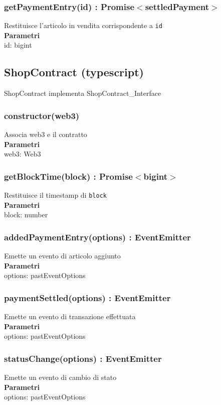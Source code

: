\documentclass[a4paper, 12pt]{article}
\begin{document}
\subsubsection{getPaymentEntry(id) : Promise$<$settledPayment$>$}
Restituisce l'articolo in vendita corrispondente a \texttt{id}\\
\textbf{Parametri}\\
id: bigint

\subsection{ShopContract (typescript)}
ShopContract implementa ShopContract\_Interface
\subsubsection{constructor(web3)}
Associa web3 e il contratto\\
\textbf{Parametri}\\
web3: Web3\\
\subsubsection{getBlockTime(block) : Promise$<$bigint$>$}
Restituisce il timestamp di \texttt{block}\\
\textbf{Parametri}\\
block: number\\
\subsubsection{addedPaymentEntry(options) : EventEmitter}
Emette un evento di articolo aggiunto\\
\textbf{Parametri}\\
options: pastEventOptions
\subsubsection{paymentSettled(options) : EventEmitter}
Emette un evento di transazione effettuata\\
\textbf{Parametri}\\
options: pastEventOptions
\subsubsection{statusChange(options) : EventEmitter}
Emette un evento di cambio di stato\\
\textbf{Parametri}\\
options: pastEventOptions
\end{document}

